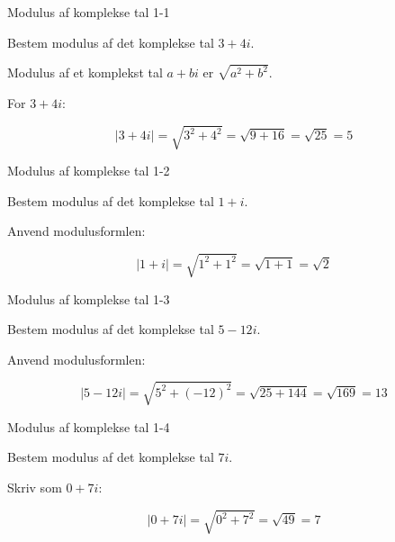 \documentclass{article}
\begin{document}

\tableofcontents
\newpage

\begin{exercise}{Modulus af komplekse tal 1-1}

Bestem modulus af det komplekse tal $3 + 4i$.


\hint

Modulus af et komplekst tal $a + bi$ er $\sqrt{a^2 + b^2}$.

\hint

For $3 + 4i$:

\hint
\[
|3 + 4i| = \sqrt{3^2 + 4^2} = \sqrt{9 + 16} = \sqrt{25} = 5
\]

\end{exercise}

\newpage

\begin{exercise}{Modulus af komplekse tal 1-2}

Bestem modulus af det komplekse tal $1 + i$.


\hint

Anvend modulusformlen:

\hint
\[
|1 + i| = \sqrt{1^2 + 1^2} = \sqrt{1 + 1} = \sqrt{2}
\]

\end{exercise}

\newpage

\begin{exercise}{Modulus af komplekse tal 1-3}

Bestem modulus af det komplekse tal $5 - 12i$.


\hint

Anvend modulusformlen:

\hint
\[
|5 - 12i| = \sqrt{5^2 + (-12)^2} = \sqrt{25 + 144} = \sqrt{169} = 13
\]

\end{exercise}

\newpage

\begin{exercise}{Modulus af komplekse tal 1-4}

Bestem modulus af det komplekse tal $7i$.


\hint

Skriv som $0 + 7i$:

\hint
\[
|0 + 7i| = \sqrt{0^2 + 7^2} = \sqrt{49} = 7
\]

\end{exercise}
\end{document}
